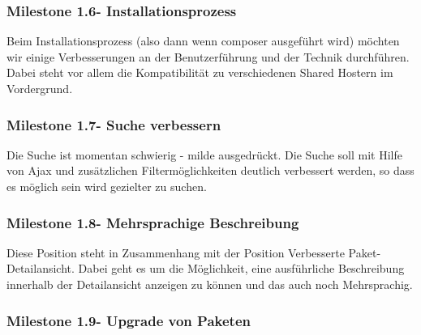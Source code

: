 \documentclass[
paper=a4,
draft=false,%
fontsize=10pt%
]{scrartcl}
\begin{document}
\subsubsection[Milestone 1.6 - Installationsprozess]{Milestone 1.6\footnotemark - Installationsprozess}
\label{subsec:ccc-milestone-1.6}

Beim Installationsprozess (also dann wenn composer ausgeführt wird) möchten wir einige Verbesserungen an der Benutzerführung und der Technik durchführen. Dabei steht vor allem die Kompatibilität zu verschiedenen Shared Hostern im Vordergrund.

\subsubsection[Milestone 1.7 - Suche verbessern]{Milestone 1.7\footnotemark - Suche verbessern}
\label{subsec:ccc-milestone-1.7}

Die Suche ist momentan schwierig - milde ausgedrückt. Die Suche soll mit Hilfe von Ajax und zusätzlichen Filtermöglichkeiten deutlich verbessert werden, so dass es möglich sein wird gezielter zu suchen.

\subsubsection[Milestone 1.8 - Mehrsprachige Beschreibung]{Milestone 1.8\footnotemark - Mehrsprachige Beschreibung}
\label{subsec:ccc-milestone-1.8}

Diese Position steht in Zusammenhang mit der Position Verbesserte Paket-Detailansicht. Dabei geht es um die Möglichkeit, eine ausführliche Beschreibung innerhalb der Detailansicht anzeigen zu können und das auch noch Mehrsprachig.

\subsubsection[Milestone 1.9 - Upgrade von Paketen]{Milestone 1.9\footnotemark - Upgrade von Paketen}
\label{subsec:ccc-milestone-1.9}
\end{document}
